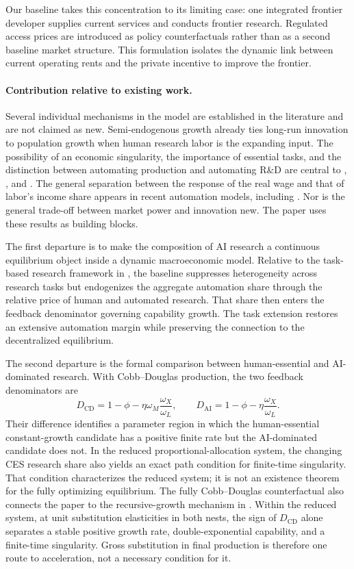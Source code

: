 Our baseline takes this concentration to its limiting case: one integrated frontier
developer supplies current services and conducts frontier research. Regulated access
prices are introduced as policy counterfactuals rather than as a second baseline
market structure. This formulation isolates the dynamic link between current
operating rents and the private incentive to improve the frontier.

\paragraph{Contribution relative to existing work.}
Several individual mechanisms in the model are established in the literature and
are not claimed as new. Semi-endogenous growth already ties long-run innovation to
population growth when human research labor is the expanding input. The possibility
of an economic singularity, the importance of essential tasks, and the distinction
between automating production and automating R\&D are central to
\citet{aghionjonesjones2019}, \citet{nordhaus2021}, and
\citet{trammellkorinek2023}. The general separation between the response of the
real wage and that of labor's income share appears in recent automation models,
including \citet{autorkausik2026}. Nor is the general trade-off between
market power and innovation new. The paper uses these results as building blocks.

The first departure is to make the composition of AI research a continuous
equilibrium object inside a dynamic macroeconomic model. Relative to the task-based
research framework in \citet{jones2025rd}, the baseline suppresses heterogeneity
across research tasks but endogenizes the aggregate automation share through the
relative price of human and automated research. That share then enters the feedback
denominator governing capability growth. The task extension restores an extensive
automation margin while preserving the connection to the decentralized equilibrium.

The second departure is the formal comparison between human-essential and
AI-dominated research. With Cobb--Douglas production, the two feedback denominators
are
\[
    D_{\mathrm{CD}}
    =1-\phi-\eta\omega_M\frac{\omega_X}{\omega_L},
    \qquad
    D_{\mathrm{AI}}
    =1-\phi-\eta\frac{\omega_X}{\omega_L}.
\]
Their difference identifies a parameter region in which the human-essential
constant-growth candidate has a positive finite rate but the AI-dominated candidate
does not. In the reduced proportional-allocation system, the changing CES research
share also yields an exact path condition for finite-time singularity. That condition
characterizes the reduced system; it is not an existence theorem for the fully
optimizing equilibrium.
The fully Cobb--Douglas counterfactual also connects the paper to the recursive-growth
mechanism in \citet{aghionjonesjones2019}. Within the reduced system, at unit
substitution elasticities in both nests, the sign of $D_{\mathrm{CD}}$ alone
separates a stable positive growth rate,
double-exponential capability, and a finite-time singularity. Gross substitution in
final production is therefore one route to acceleration, not a necessary condition
for it.

